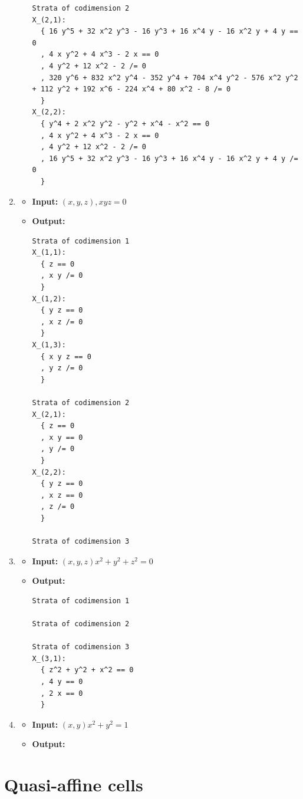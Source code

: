 \documentclass[
]{book}
\theoremstyle{definition}
\theoremstyle{definition}
\theoremstyle{definition}
\theoremstyle{definition}
\theoremstyle{remark}
\begin{document}
\begin{enumerate}
\begin{itemize}
\begin{verbatim}
Strata of codimension 2
X_(2,1):
  { 16 y^5 + 32 x^2 y^3 - 16 y^3 + 16 x^4 y - 16 x^2 y + 4 y == 0
  , 4 x y^2 + 4 x^3 - 2 x == 0
  , 4 y^2 + 12 x^2 - 2 /= 0
  , 320 y^6 + 832 x^2 y^4 - 352 y^4 + 704 x^4 y^2 - 576 x^2 y^2 + 112 y^2 + 192 x^6 - 224 x^4 + 80 x^2 - 8 /= 0
  }
X_(2,2):
  { y^4 + 2 x^2 y^2 - y^2 + x^4 - x^2 == 0
  , 4 x y^2 + 4 x^3 - 2 x == 0
  , 4 y^2 + 12 x^2 - 2 /= 0
  , 16 y^5 + 32 x^2 y^3 - 16 y^3 + 16 x^4 y - 16 x^2 y + 4 y /= 0
  }
\end{verbatim}
  \end{itemize}
\item
  \begin{itemize}
  \item
    \textbf{Input:} \((x,y,z), x y z = 0\)
  \item
    \textbf{Output:}

\begin{verbatim}
Strata of codimension 1
X_(1,1):
  { z == 0
  , x y /= 0
  }
X_(1,2):
  { y z == 0
  , x z /= 0
  }
X_(1,3):
  { x y z == 0
  , y z /= 0
  }

Strata of codimension 2
X_(2,1):
  { z == 0
  , x y == 0
  , y /= 0
  }
X_(2,2):
  { y z == 0
  , x z == 0
  , z /= 0
  }

Strata of codimension 3
\end{verbatim}
  \end{itemize}
\item
  \begin{itemize}
  \item
    \textbf{Input:} \((x,y,z) x^2 + y^2 + z^2 = 0\)
  \item
    \textbf{Output:}

\begin{verbatim}
Strata of codimension 1

Strata of codimension 2

Strata of codimension 3
X_(3,1):
  { z^2 + y^2 + x^2 == 0
  , 4 y == 0
  , 2 x == 0
  }
\end{verbatim}
  \end{itemize}
\item
  \begin{itemize}
  \item
    \textbf{Input:} \((x,y) x^2 + y^2 = 1\)
  \item
    \textbf{Output:}
  \end{itemize}
\end{enumerate}

\hypertarget{sec:quasi-affine}{%
\chapter{Quasi-affine cells}\label{sec:quasi-affine}}
\end{document}
